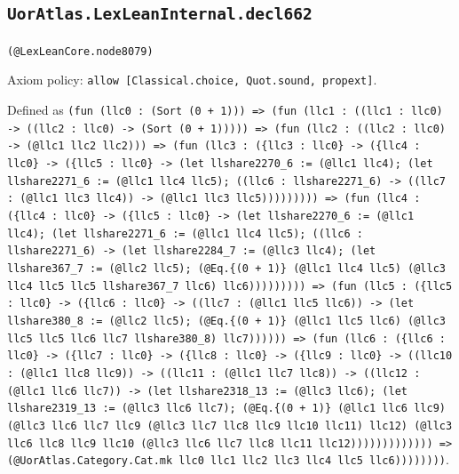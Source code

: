 \documentclass[11pt]{article}
\begin{document}
\subsection*{\texttt{UorAtlas.LexLeanInternal.decl662}}
\noindent\texttt{(@LexLeanCore.node8079)}\par
\noindent Axiom policy: \texttt{allow [Classical.choice, Quot.sound, propext]}.\par
\noindent Defined as \texttt{(fun (llc0 : (Sort (0 + 1))) => (fun (llc1 : ((llc1 : llc0) -> ((llc2 : llc0) -> (Sort (0 + 1))))) => (fun (llc2 : ((llc2 : llc0) -> (@llc1 llc2 llc2))) => (fun (llc3 : (\{llc3 : llc0\} -> (\{llc4 : llc0\} -> (\{llc5 : llc0\} -> (let llshare2270\_6 := (@llc1 llc4); (let llshare2271\_6 := (@llc1 llc4 llc5); ((llc6 : llshare2271\_6) -> ((llc7 : (@llc1 llc3 llc4)) -> (@llc1 llc3 llc5))))))))) => (fun (llc4 : (\{llc4 : llc0\} -> (\{llc5 : llc0\} -> (let llshare2270\_6 := (@llc1 llc4); (let llshare2271\_6 := (@llc1 llc4 llc5); ((llc6 : llshare2271\_6) -> (let llshare2284\_7 := (@llc3 llc4); (let llshare367\_7 := (@llc2 llc5); (@Eq.\{(0 + 1)\} (@llc1 llc4 llc5) (@llc3 llc4 llc5 llc5 llshare367\_7 llc6) llc6))))))))) => (fun (llc5 : (\{llc5 : llc0\} -> (\{llc6 : llc0\} -> ((llc7 : (@llc1 llc5 llc6)) -> (let llshare380\_8 := (@llc2 llc5); (@Eq.\{(0 + 1)\} (@llc1 llc5 llc6) (@llc3 llc5 llc5 llc6 llc7 llshare380\_8) llc7)))))) => (fun (llc6 : (\{llc6 : llc0\} -> (\{llc7 : llc0\} -> (\{llc8 : llc0\} -> (\{llc9 : llc0\} -> ((llc10 : (@llc1 llc8 llc9)) -> ((llc11 : (@llc1 llc7 llc8)) -> ((llc12 : (@llc1 llc6 llc7)) -> (let llshare2318\_13 := (@llc3 llc6); (let llshare2319\_13 := (@llc3 llc6 llc7); (@Eq.\{(0 + 1)\} (@llc1 llc6 llc9) (@llc3 llc6 llc7 llc9 (@llc3 llc7 llc8 llc9 llc10 llc11) llc12) (@llc3 llc6 llc8 llc9 llc10 (@llc3 llc6 llc7 llc8 llc11 llc12))))))))))))) => (@UorAtlas.Category.Cat.mk llc0 llc1 llc2 llc3 llc4 llc5 llc6))))))))}.\par
\end{document}

